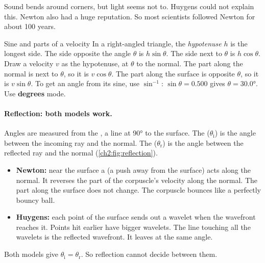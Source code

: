 Sound bends around corners, but light seems not to. Huygens could not explain this.
Newton also had a huge reputation. So most scientists followed Newton for about 100
years.

\begin{toolkit}{Sine and parts of a velocity}
In a right-angled triangle, the \emph{hypotenuse} $h$ is the longest side. The side
opposite the angle $\theta$ is $h\sin\theta$. The side next to $\theta$ is $h\cos\theta$.
Draw a velocity $v$ as the hypotenuse, at $\theta$ to the normal. The part along the
normal is next to $\theta$, so it is $v\cos\theta$. The part along the surface is opposite
$\theta$, so it is $v\sin\theta$. To get an angle from its sine, use $\sin^{-1}$:
$\sin\theta = 0.500$ gives $\theta = \ang{30.0}$. Use \textbf{degrees} mode.
\end{toolkit}

\paragraph{Reflection: both models work.} Angles are measured from the , a
line at \ang{90} to the surface. The  ($\theta_\mathrm{i}$) is the
angle between the incoming ray and the normal. The 
($\theta_\mathrm{r}$) is the angle between the reflected ray and the normal
(\cref{ch2:fig:reflection}).
\begin{itemize}
  \item \textbf{Newton:} near the surface a  (a push away from the
        surface) acts along the normal. It reverses the part of the corpuscle's velocity
        along the normal. The part along the surface does not change. The corpuscle
        bounces like a perfectly bouncy ball.
  \item \textbf{Huygens:} each point of the surface sends out a wavelet when the
        wavefront reaches it. Points hit earlier have bigger wavelets. The line touching
        all the wavelets is the reflected wavefront. It leaves at the same angle.
\end{itemize}
Both models give $\theta_\mathrm{i} = \theta_\mathrm{r}$. So reflection cannot decide
between them.


